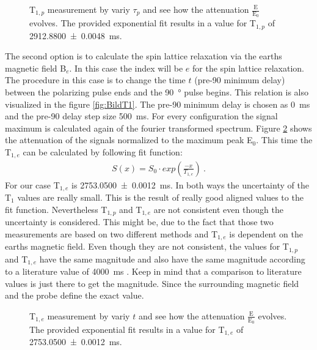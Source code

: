 \begin{figure}[H]
    \centering
    
    \caption[T$_{1,p}$ measurement by variy $\tau_p$ and see how the attenuation $\frac{\text{E}}{\text{E}_0}$ evolves.]{T$_{1,p}$ measurement by variy $\tau_p$ and see how the attenuation $\frac{\text{E}}{\text{E}_0}$ evolves. The provided exponential fit results in a value for T$_{1,p}$ of \SI{2912.8800 \pm 0.0048}{\milli \second}.}
    \label{fig:T1Polarisationsfeldfeld}
\end{figure}

The second option is to calculate the spin lattice relaxation via the earths magnetic field B$_e$. In this case the index will be $e$ for the spin lattice relaxation. The procedure in this case is to change the time $t$ (pre-90 minimum delay) between the polarizing pulse ends and the \SI{90}{\degree} pulse begins. This relation is also visualized in the figure \ref{fig:BildT1}. The pre-90 minimum delay is chosen as \SI{0}{\milli \second} and the pre-90 delay step size \SI{500}{\milli \second}. For every configuration the signal maximum is calculated again of the fourier transformed spectrum. Figure \ref{fig:T1Erdmagnetfeld} shows the attenuation of the signals normalized to the maximum peak E$_0$. This time the T$_{1,e}$ can be calculated by following fit function:
\begin{align}
    S(x) = S_0 \cdot exp\left(\frac{-x}{T_{1,e}}\right) \ .
    \label{eq: fitBe}
\end{align}
For our case T$_{1,e}$ is \SI{2753.0500 \pm 0.0012}{\milli \second}.\newline
In both ways the uncertainty of the T$_1$ values are really small. This is the result of really good aligned values to the fit function. Nevertheless T$_{1,p}$ and T$_{1,e}$ are not consistent even though the uncertainty is considered. This might be, due to the fact that those two measurements are based on two different methods and T$_{1,e}$ is dependent on the earths magnetic field. Even though they are not consistent, the values for T$_{1,p}$ and T$_{1,e}$ have the same magnitude and also have the same magnitude according to a literature value of \SI{4000}{\milli \second} \cite{literaturT1}. Keep in mind that a comparison to literature values is just there to get the magnitude. Since the surrounding magnetic field and the probe define the exact value.
\begin{figure}[H]
    \centering
    
    \caption[T$_{1,e}$ measurement by variy $t$ and see how the attenuation $\frac{\text{E}}{\text{E}_0}$ evolves.]{T$_{1,e}$ measurement by variy $t$ and see how the attenuation $\frac{\text{E}}{\text{E}_0}$ evolves. The provided exponential fit results in a value for T$_{1,e}$ of \SI{2753.0500 \pm 0.0012}{\milli \second}.}
    \label{fig:T1Erdmagnetfeld}
\end{figure}
